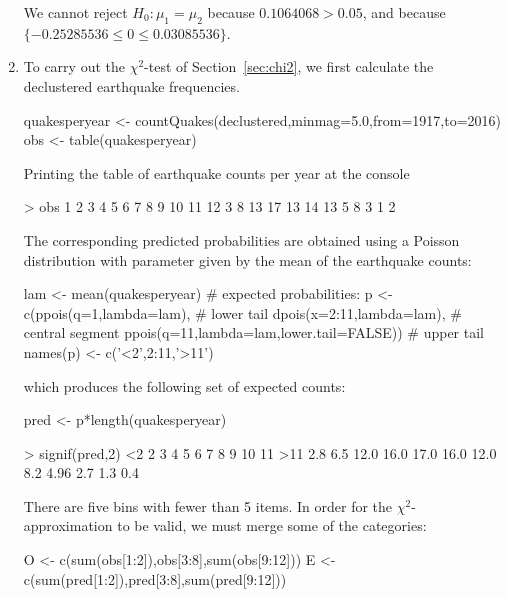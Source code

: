 \begin{enumerate}
We cannot reject $H_0: \mu_1=\mu_2$ because $0.1064068>0.05$, and
because $\{-0.25285536\leq{0}\leq{0.03085536}\}$.

\item To carry out the $\chi^2$-test of Section~\ref{sec:chi2}, we
  first calculate the declustered earthquake frequencies.

\begin{script}
quakesperyear <- countQuakes(declustered,minmag=5.0,from=1917,to=2016)
obs <- table(quakesperyear)
\end{script}

Printing the table of earthquake counts per year at the console

\begin{console}
> obs
 1  2  3  4  5  6  7  8  9 10 11 12 
 3  8 13 17 13 14 13  5  8  3  1  2 
\end{console}

The corresponding predicted probabilities are obtained using a Poisson
distribution with parameter given by the mean of the earthquake
counts:

\begin{script}[firstnumber=3]
lam <- mean(quakesperyear)
# expected probabilities:
p <- c(ppois(q=1,lambda=lam),                   # lower tail
       dpois(x=2:11,lambda=lam),                # central segment
       ppois(q=11,lambda=lam,lower.tail=FALSE)) # upper tail
names(p) <- c('<2',2:11,'>11')
\end{script}

\noindent which produces the following set of expected counts:

\begin{script}[firstnumber=9]
pred <- p*length(quakesperyear)       
\end{script}

\begin{console}
> signif(pred,2)
  <2    2    3    4    5    6    7    8     9   10   11  >11 
 2.8  6.5 12.0 16.0 17.0 16.0 12.0  8.2  4.96  2.7  1.3  0.4
\end{console}

There are five bins with fewer than 5 items. In order for the
$\chi^2$-approximation to be valid, we must merge some of the
categories:

\begin{script}[firstnumber=10]
O <- c(sum(obs[1:2]),obs[3:8],sum(obs[9:12]))
E <- c(sum(pred[1:2]),pred[3:8],sum(pred[9:12]))
\end{script}


\end{enumerate}
